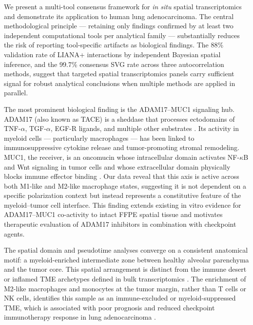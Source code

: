 \documentclass[12pt,a4paper]{article}
\begin{document}
We present a multi-tool consensus framework for \textit{in situ} spatial transcriptomics and demonstrate its application to human lung adenocarcinoma. The central methodological principle --- retaining only findings confirmed by at least two independent computational tools per analytical family --- substantially reduces the risk of reporting tool-specific artifacts as biological findings. The 88\% validation rate of LIANA+ interactions by independent Bayesian spatial inference, and the 99.7\% consensus SVG rate across three autocorrelation methods, suggest that targeted spatial transcriptomics panels carry sufficient signal for robust analytical conclusions when multiple methods are applied in parallel.

The most prominent biological finding is the ADAM17--MUC1 signaling hub. ADAM17 (also known as TACE) is a sheddase that processes ectodomains of TNF-$\alpha$, TGF-$\alpha$, EGF-R ligands, and multiple other substrates \citep{lambrecht2018adam17}. Its activity in myeloid cells --- particularly macrophages --- has been linked to immunosuppressive cytokine release and tumor-promoting stromal remodeling. MUC1, the receiver, is an oncomucin whose intracellular domain activates NF-$\kappa$B and Wnt signaling in tumor cells and whose extracellular domain physically blocks immune effector binding \citep{nath2013muc1}. Our data reveal that this axis is active across both M1-like and M2-like macrophage states, suggesting it is not dependent on a specific polarization context but instead represents a constitutive feature of the myeloid--tumor cell interface. This finding extends existing in vitro evidence for ADAM17--MUC1 co-activity to intact FFPE spatial tissue and motivates therapeutic evaluation of ADAM17 inhibitors in combination with checkpoint agents.

The spatial domain and pseudotime analyses converge on a consistent anatomical motif: a myeloid-enriched intermediate zone between healthy alveolar parenchyma and the tumor core. This spatial arrangement is distinct from the immune desert or inflamed TME archetypes defined in bulk transcriptomics \citep{chen2016elements}. The enrichment of M2-like macrophages and monocytes at the tumor margin, rather than T cells or NK cells, identifies this sample as an immune-excluded or myeloid-suppressed TME, which is associated with poor prognosis and reduced checkpoint immunotherapy response in lung adenocarcinoma \citep{cassetta2020targeting, wu2021single}.
\end{document}

